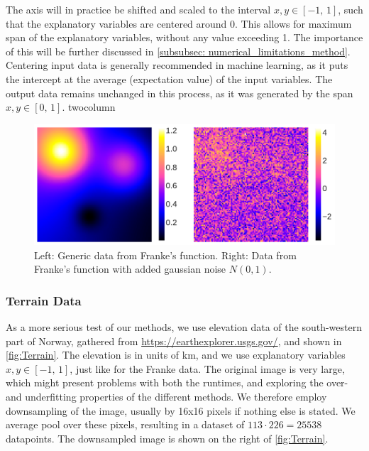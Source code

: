 \documentclass[10pt, twocolumn]{article}
\begin{document}
The axis will in practice be shifted and scaled to the interval $x,y \in [-1,\, 1]$, such that the explanatory variables are centered around 0. This allows for maximum span of the explanatory variables, without any value exceeding 1. The importance of this will be further discussed in \cref{subsubsec: numerical_limitations_method}. Centering input data is generally recommended in machine learning, as it puts the intercept at the average (expectation value) of the input variables. The output data remains unchanged in this process, as it was generated by the span $x,y \in [0,\, 1]$.
twocolumn
\begin{figure}[h!]
    \centering
    \includegraphics[scale=0.4]{../figs/Franke.pdf}
    \caption{Left: Generic data from Franke's function. Right: Data from Franke's function with added gaussian noise $N(0, 1)$.}
    \label{fig:Franke}
\end{figure}


\subsubsection{Terrain Data}
As a more serious test of our methods, we use elevation data of the south-western part of Norway, gathered from \url{https://earthexplorer.usgs.gov/}, and shown in \cref{fig:Terrain}. The elevation is in units of km, and we use explanatory variables $x,y \in [-1,\, 1]$, just like for the Franke data. The original image is very large, which might present problems with both the runtimes, and exploring the over- and underfitting properties of the different methods. We therefore employ downsampling of the image, usually by 16x16 pixels if nothing else is stated. We average pool over these pixels, resulting in a dataset of $113\cdot 226 = 25538$ datapoints. The downsampled image is shown on the right of \cref{fig:Terrain}.
\end{document}
